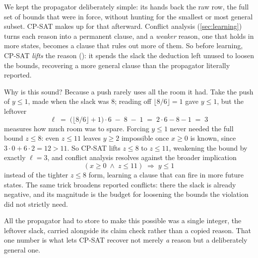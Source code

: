 We kept the propagator deliberately simple: its  hands back the raw
row, the full set of bounds that were in force, without hunting for the smallest or
most general subset. CP-SAT makes up for that afterward. Conflict analysis
(\cref{sec:learning}) turns each reason into a permanent clause, and a
\emph{weaker} reason, one that holds in more states, becomes a clause that rules out
more of them. So before learning, CP-SAT \emph{lifts} the reason
(): it spends the slack the deduction
left unused to loosen the bounds, recovering a more general clause than the
propagator literally reported.

Why is this sound? Because a push rarely uses all the room it had. Take the push of
$y \le 1$, made when the slack was $8$; reading off $\lfloor 8/6 \rfloor = 1$ gave
$y \le 1$, but the leftover
\[
  \ell \;=\; \big(\lfloor 8/6 \rfloor + 1\big)\cdot 6 \;-\; 8 \;-\; 1
        \;=\; 2\cdot 6 - 8 - 1 \;=\; 3
\]
measures how much room was to spare. Forcing $y \le 1$ never needed the full bound
$z \le 8$: even $z \le 11$ leaves $y \ge 2$ impossible once $x \ge 0$ is known,
since $3\cdot 0 + 6\cdot 2 = 12 > 11$. So CP-SAT lifts $z \le 8$ to $z \le 11$,
weakening the bound by exactly $\ell = 3$, and conflict analysis resolves against
the broader implication
\[
  (x \ge 0 \;\wedge\; z \le 11) \;\Rightarrow\; y \le 1
\]
instead of the tighter $z \le 8$ form, learning a clause that can fire in more
future states. The same trick broadens reported conflicts: there the slack is
already negative, and its magnitude is the budget for loosening the bounds the
violation did not strictly need.

All the propagator had to store to make this possible was a single integer, the
leftover slack, carried alongside its claim check rather than a copied reason. That
one number is what lets CP-SAT recover not merely \emph{a} reason but a deliberately
general one.

